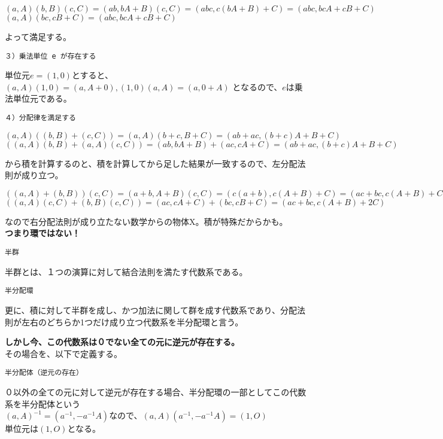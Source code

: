 \documentclass[
]{article}
\begin{document}
\((a,A)(b,B)(c,C)= (ab,bA+B)(c,C)=(abc,c(bA+B)+C)=(abc,bcA+cB+C)\)\\
\((a,A)(bc,cB+C)=(abc,bcA+cB+C)\)

よって満足する。

\begin{verbatim}
３）乗法単位 e が存在する  
\end{verbatim}

単位元\(e=(1,0)\)とすると、\((a,A)(1,0)=(a,A+0),(1,0)(a,A)=(a,0+A)\)
となるので、\(e\)は乗法単位元である。

\begin{verbatim}
４）分配律を満足する  
\end{verbatim}

\((a,A)((b,B)+(c,C))=(a,A)(b+c,B+C)=(ab+ac,(b+c)A+B+C)\)\\
\(((a,A)(b,B)+(a,A)(c,C))=(ab,bA+B)+(ac,cA+C)=(ab+ac,(b+c)A+B+C)\)

から積を計算するのと、積を計算してから足した結果が一致するので、左分配法則が成り立つ。

\(((a,A)+(b,B))(c,C)=(a+b,A+B)(c,C)=(c(a+b),c(A+B)+C)= (ac+bc,c(A+B)+C) \neq\)\\
\(((a,A)(c,C)+(b,B)(c,C))=(ac,cA+C)+(bc,cB+C)=(ac+bc,c(A+B)+2C)\)

なので右分配法則が成り立たない数学からの物体X。積が特殊だからかも。\\
\textbf{つまり環ではない！}

\begin{verbatim}
半群
\end{verbatim}

半群とは、１つの演算に対して結合法則を満たす代数系である。

\begin{verbatim}
半分配環
\end{verbatim}

更に、積に対して半群を成し、かつ加法に関して群を成す代数系であり、分配法則が左右のどちらか1つだけ成り立つ代数系を半分配環と言う。

\textbf{しかし今、この代数系は０でない全ての元に逆元が存在する。}\\
その場合を、以下で定義する。

\begin{verbatim}
半分配体（逆元の存在）
\end{verbatim}

０以外の全ての元に対して逆元が存在する場合、半分配環の一部としてこの代数系を半分配体という\\
\((a,A)^{-1}=(a^{-1},-a^{-1}A)\)なので、\((a,A)(a^{-1},-a^{-1}A)=(1,O)\)\\
単位元は\((1,O)\)となる。
\end{document}
